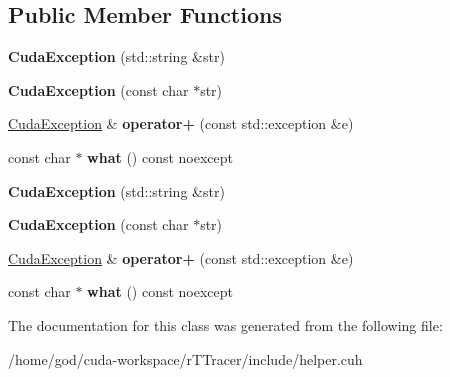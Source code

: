 \subsection*{Public Member Functions}
\begin{DoxyCompactItemize}
\item 
{\bfseries Cuda\+Exception} (std\+::string \&str)\hypertarget{class_cuda_exception_a17f8e85766f624c09c901bcdd79d7042}{}\label{class_cuda_exception_a17f8e85766f624c09c901bcdd79d7042}

\item 
{\bfseries Cuda\+Exception} (const char $\ast$str)\hypertarget{class_cuda_exception_a0d89dc2c59c4b25590ed463554af284d}{}\label{class_cuda_exception_a0d89dc2c59c4b25590ed463554af284d}

\item 
\hyperlink{class_cuda_exception}{Cuda\+Exception} \& {\bfseries operator+} (const std\+::exception \&e)\hypertarget{class_cuda_exception_acf9ac22baa0064c2e2d44faa222324b4}{}\label{class_cuda_exception_acf9ac22baa0064c2e2d44faa222324b4}

\item 
const char $\ast$ {\bfseries what} () const noexcept\hypertarget{class_cuda_exception_a5392d02d126a57a15cef5ff922ecbe3b}{}\label{class_cuda_exception_a5392d02d126a57a15cef5ff922ecbe3b}

\item 
{\bfseries Cuda\+Exception} (std\+::string \&str)\hypertarget{class_cuda_exception_a17f8e85766f624c09c901bcdd79d7042}{}\label{class_cuda_exception_a17f8e85766f624c09c901bcdd79d7042}

\item 
{\bfseries Cuda\+Exception} (const char $\ast$str)\hypertarget{class_cuda_exception_a0d89dc2c59c4b25590ed463554af284d}{}\label{class_cuda_exception_a0d89dc2c59c4b25590ed463554af284d}

\item 
\hyperlink{class_cuda_exception}{Cuda\+Exception} \& {\bfseries operator+} (const std\+::exception \&e)\hypertarget{class_cuda_exception_acf9ac22baa0064c2e2d44faa222324b4}{}\label{class_cuda_exception_acf9ac22baa0064c2e2d44faa222324b4}

\item 
const char $\ast$ {\bfseries what} () const noexcept\hypertarget{class_cuda_exception_a5392d02d126a57a15cef5ff922ecbe3b}{}\label{class_cuda_exception_a5392d02d126a57a15cef5ff922ecbe3b}

\end{DoxyCompactItemize}


The documentation for this class was generated from the following file\+:\begin{DoxyCompactItemize}
\item 
/home/god/cuda-\/workspace/r\+T\+Tracer/include/helper.\+cuh\end{DoxyCompactItemize}
